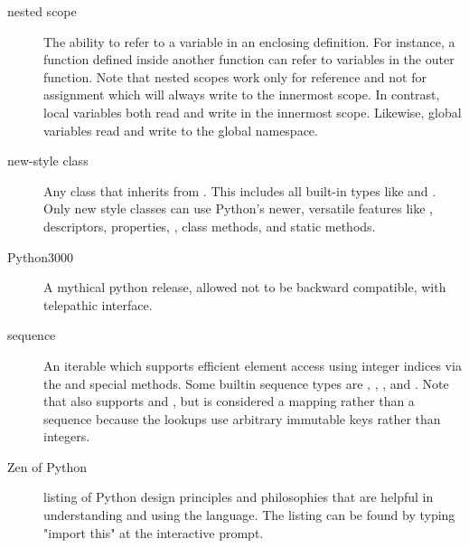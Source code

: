 \begin{description}
\item[nested scope]{The ability to refer to a variable in an enclosing
definition.  For instance, a function defined inside another function can
refer to variables in the outer function.  Note that nested scopes work only
for reference and not for assignment which will always write to the
innermost scope.  In contrast, local variables both read and write in the
innermost scope.  Likewise, global variables read and write to the global
namespace.}

\item[new-style class]{Any class that inherits from .  This
includes all built-in types like  and .  Only new
style classes can use Python's newer, versatile features like
{}, descriptors, properties, , class
methods, and static methods.}

\item[Python3000]{A mythical python release, allowed not to be backward
compatible, with telepathic interface.}

\item[sequence]{An iterable which supports efficient element access using
integer indices via the  and 
special methods.  Some builtin sequence types are , ,
{}, and .  Note that  also supports
{} and , but is considered a mapping
rather than a sequence because the lookups use arbitrary immutable keys
rather than integers.}

\item[Zen of Python]{listing of Python design principles and philosophies
that are helpful in understanding and using the language.  The listing can
be found by typing "import this" at the interactive prompt.}

\end{description}

